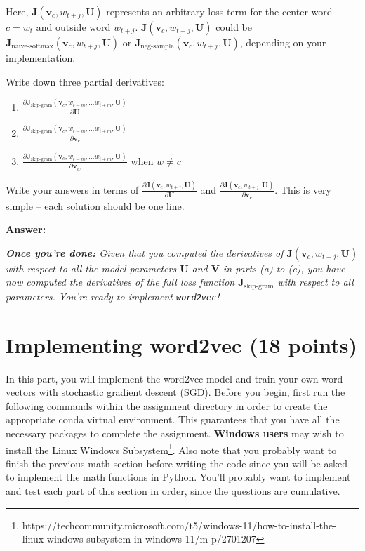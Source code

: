 \documentclass{article}
\newenvironment{answer}{
    {\bf Answer:} \sf \begingroup\color{red}
}{\endgroup}%
\begin{document}
\begin{enumerate}[label=(\alph*)]
Here, $\bm J(\bm v_c, w_{t+j}, \bm U)$ represents an arbitrary loss term for the center word $c=w_t$ and outside word $w_{t+j}$. $\bm J(\bm v_c, w_{t+j}, \bm U)$ could be $\bm J_{\text{naive-softmax}}(\bm v_c, w_{t+j}, \bm U)$ or $\bm J_{\text{neg-sample}}(\bm v_c, w_{t+j}, \bm U)$, depending on your implementation.

Write down three partial derivatives: 
\begin{enumerate}[label=(\roman*)]
    \item ${\frac{\partial \bm J_{\textrm{skip-gram}}(\bm v_c, w_{t-m},\ldots w_{t+m}, \bm U)} {\partial \bm U}}$
    \item ${\frac{\partial \bm J_{\textrm{skip-gram}}(\bm v_c, w_{t-m},\ldots w_{t+m}, \bm U)} {\partial \bm v_c}}$
    \item ${\frac{\partial \bm J_{\textrm{skip-gram}}(\bm v_c, w_{t-m},\ldots w_{t+m}, \bm U)} {\partial \bm v_w}}$ when $w \ne c$
\end{enumerate}
Write your answers in terms of ${\frac{\partial \bm J(\bm v_c, w_{t+j}, \bm U)}{\partial \bm U}}$ and ${\frac{\partial \bm J(\bm v_c, w_{t+j}, \bm U)}{\partial \bm v_c}}$. This is very simple -- each solution should be one line.

\begin{shaded}
\begin{answer}

\end{answer}
\end{shaded}

\textit{\textbf{Once you're done:} Given that you computed the derivatives of $\bm J(\bm v_c, w_{t+j}, \bm U)$ with respect to all the model parameters $\bm U$ and $\bm V$ in parts (a) to (c), you have now computed the derivatives of the full loss function $\bm J_{\text{skip-gram}}$ with respect to all parameters. You're ready to implement \texttt{word2vec}!} %

\end{enumerate}

\section{Implementing word2vec (18 points)}
In this part, you will implement the word2vec model and train your own word vectors with stochastic gradient descent (SGD). Before you begin, first run the following commands within the assignment directory in order to create the appropriate conda virtual environment. This guarantees that you have all the necessary packages to complete the assignment. \textbf{Windows users} may wish to install the Linux Windows Subsystem\footnote{https://techcommunity.microsoft.com/t5/windows-11/how-to-install-the-linux-windows-subsystem-in-windows-11/m-p/2701207}. Also note that you probably want to finish the previous math section before writing the code since you will be asked to implement the math functions in Python. You’ll probably want to implement and test each part of this section in order, since the questions are cumulative.
\end{document}

